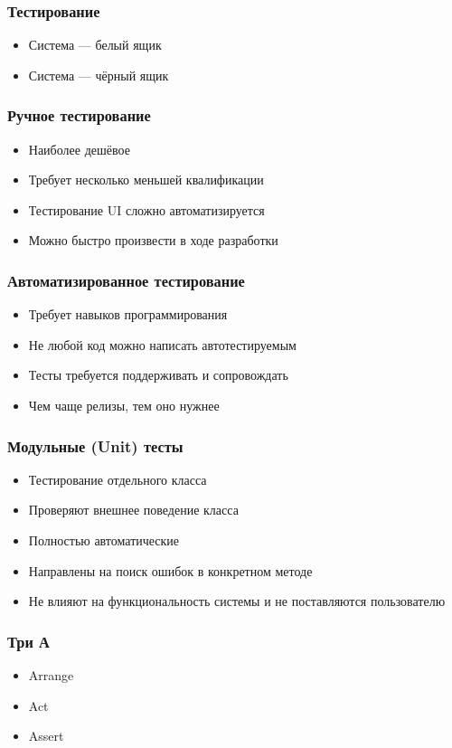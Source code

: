 \documentclass{beamer}
\begin{document}
\begin{frame}
  \frametitle{Тестирование}
  \begin{itemize}
    \item Система --- белый ящик
    \item Система --- чёрный ящик
  \end{itemize}
\end{frame}

\begin{frame}
  \frametitle{Ручное тестирование}
  \begin{itemize}
    \item Наиболее дешёвое
    \item Требует несколько меньшей квалификации
    \item Тестирование UI сложно автоматизируется
    \item Можно быстро произвести в ходе разработки
  \end{itemize}
\end{frame}

\begin{frame}
  \frametitle{Автоматизированное тестирование}
  \begin{itemize}
    \item Требует навыков программирования
    \item Не любой код можно написать автотестируемым
    \item Тесты требуется поддерживать и сопровождать
    \item Чем чаще релизы, тем оно нужнее
  \end{itemize}
\end{frame}

\begin{frame}
  \frametitle{Модульные (Unit) тесты}
  \begin{itemize}
    \item Тестирование отдельного класса
    \item Проверяют внешнее поведение класса
    \item Полностью автоматические
    \item Направлены на поиск ошибок в конкретном методе
    \item Не влияют на функциональность системы и не поставляются пользователю
  \end{itemize}
\end{frame}

\begin{frame}
  \frametitle{Три А}
  \begin{itemize}
    \item Arrange
    \item Act
    \item Assert
  \end{itemize}
\end{frame}
\end{document}
